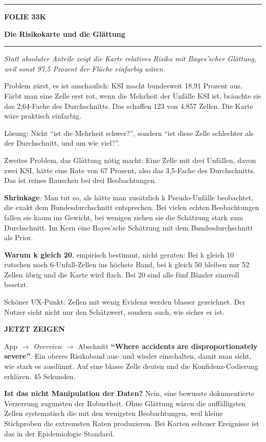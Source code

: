 \documentclass[9pt]{extarticle}
\newcommand{\karte}[3]{%
  \clearpage
  {\color{Accent}\rule{\linewidth}{2.4pt}}\par\vspace{2.5pt}
  {\fontsize{8}{9}\selectfont\bfseries\color{Accent}%
   FOLIE #1\hspace{1.2em}\textbar\hspace{1.2em}#2}\par\vspace{1pt}
  {\fontsize{16}{18}\selectfont\bfseries\color{AccentDark}#3}\par\vspace{3pt}
  {\color{Accent!45}\rule{\linewidth}{0.5pt}}\par\vspace{4pt}%
}
\newcommand{\rubrik}[1]{%
  \vspace{3.5pt}{\fontsize{7.5}{8.5}\selectfont\bfseries\color{Grau}%
  \MakeUppercase{#1}}\par\vspace{1.5pt}}
\newcommand{\kernsatz}[1]{%
  \begin{tcolorbox}[enhanced,sharp corners,boxrule=0pt,
    leftrule=2.2pt,colframe=Accent,colback=AccentPale,
    left=5pt,right=5pt,top=3.5pt,bottom=3.5pt,before skip=1pt,after skip=2pt]
    \color{AccentDark}\itshape #1
  \end{tcolorbox}}
\newcommand{\zeigen}[1]{%
  \begin{tcolorbox}[enhanced,sharp corners,boxrule=0pt,
    leftrule=2.2pt,colframe=Demo,colback=DemoPale,
    left=5pt,right=5pt,top=3.5pt,bottom=3.5pt,before skip=3pt,after skip=2pt]
    {\fontsize{7.5}{8.5}\selectfont\bfseries\color{Demo}JETZT ZEIGEN}\par\vspace{2pt}
    #1
  \end{tcolorbox}}
\newcommand{\frage}[2]{\item \textbf{\color{AccentDark}#1} #2}
\begin{document}
\karte{33}{K}{Die Risikokarte und die Glättung}

\kernsatz{Statt absoluter Anteile zeigt die Karte relatives Risiko mit Bayes'scher Glättung,
weil sonst 97,5 Prozent der Fläche einfarbig wären.}

\rubrik{Sagen}
\begin{sag}
  \item Problem zürst, es ist anschaulich: KSI macht bundesweit 18,91 Prozent aus. Färbt man
        eine Zelle erst rot, wenn die Mehrheit der Unfälle KSI ist, bräuchte sie das 2,64-Fache
        des Durchschnitts. Das schaffen 123 von 4.857 Zellen. Die Karte wäre praktisch einfarbig.
  \item Lösung: Nicht \enquote{ist die Mehrheit schwer?}, sondern \enquote{ist diese Zelle
        schlechter als der Durchschnitt, und um wie viel?}.
  \item Zweites Problem, das Glättung nötig macht: Eine Zelle mit drei Unfällen, davon zwei KSI,
        hätte eine Rate von 67 Prozent, also das 3,5-Fache des Durchschnitts. Das ist reines
        Rauschen bei drei Beobachtungen.
  \item \textbf{Shrinkage}: Man tut so, als hätte man zusätzlich k Pseudo-Unfälle beobachtet,
        die exakt dem Bundesdurchschnitt entsprechen. Bei vielen echten Beobachtungen fallen sie
        kaum ins Gewicht, bei wenigen ziehen sie die Schätzung stark zum Durchschnitt. Im Kern
        eine Bayes'sche Schätzung mit dem Bundesdurchschnitt als Prior.
  \item \textbf{Warum k gleich 20}, empirisch bestimmt, nicht geraten: Bei k gleich 10 rutschen
        noch 6-Unfall-Zellen ins höchste Band, bei k gleich 50 bleiben nur 52 Zellen übrig und
        die Karte wird flach. Bei 20 sind alle fünf Bänder sinnvoll besetzt.
  \item Schöner UX-Punkt: Zellen mit wenig Evidenz werden blasser gezeichnet. Der Nutzer sieht
        nicht nur den Schätzwert, sondern auch, wie sicher er ist.
\end{sag}

\zeigen{App $\rightarrow$ \textit{Overview} $\rightarrow$ Abschnitt \textbf{\enquote{Where
accidents are disproportionately severe}}. Ein oberes Risikoband aus- und wieder einschalten,
damit man sieht, wie stark es ausdünnt. Auf eine blasse Zelle deuten und die Konfidenz-Codierung
erklären. 45 Sekunden.}

\rubrik{Wenn gefragt}
\begin{begriff}
  \frage{Ist das nicht Manipulation der Daten?}{Nein, eine bewusste dokumentierte Verzerrung
    zugunsten der Robustheit. Ohne Glättung wären die auffälligsten Zellen systematisch die mit
    den wenigsten Beobachtungen, weil kleine Stichproben die extremsten Raten produzieren. Bei
    Karten seltener Ereignisse ist das in der Epidemiologie Standard.}
\end{begriff}
\end{document}
